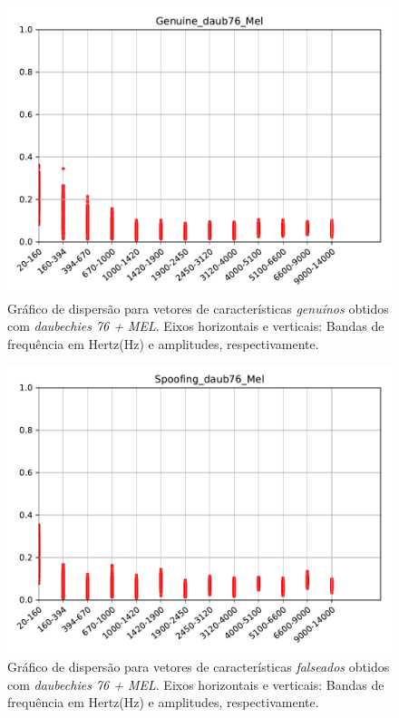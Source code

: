 		\begin{figure}[H]
			\centering
			\includegraphics[scale=.8]{images/results/barkVersusMel/Genuine_daub76_Mel.pdf}
			\caption{Gráfico de dispersão para vetores de características \textit{genuínos} obtidos com \textit{daubechies 76 + MEL}.  Eixos horizontais e verticais: Bandas de frequência em Hertz(Hz) e amplitudes, respectivamente.}
			\label{fig:livedaub76mel}
		\end{figure}
		\begin{figure}[H]
			\centering
			\includegraphics[scale=.8]{images/results/barkVersusMel/Spoofing_daub76_Mel.pdf}
			\caption{Gráfico de dispersão para vetores de características \textit{falseados} obtidos com \textit{daubechies 76 + MEL}.  Eixos horizontais e verticais: Bandas de frequência em Hertz(Hz) e amplitudes, respectivamente.}
			\label{fig:spoofingdaub76mel}
		\end{figure}